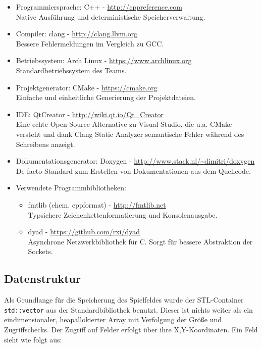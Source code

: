\documentclass[12pt,a4paper]{article}
\begin{document}
\begin{itemize}
\item Programmiersprache: C++ - \url{http://cppreference.com} \\
Native Ausführung und deterministische Speicherverwaltung.
\item Compiler: clang - \url{http://clang.llvm.org} \\
Bessere Fehlermeldungen im Vergleich zu GCC.
\item Betriebssystem: Arch Linux - \url{https://www.archlinux.org} \\
Standardbetriebssystem des Teams.
\item Projektgenerator: CMake - \url{https://cmake.org} \\
Einfache und einheitliche Generierung der Projektdateien.
\item IDE: QtCreator - \url{http://wiki.qt.io/Qt_Creator} \\
Eine echte Open Source Alternative zu Visual Studio, die u.a. CMake versteht und dank Clang Static Analyzer semantische Fehler während des Schreibens anzeigt.
\item Dokumentationsgenerator: Doxygen - \url{http://www.stack.nl/~dimitri/doxygen} \\
De facto Standard zum Erstellen von Dokumentationen aus dem Quellcode.

\item Verwendete Programmbibliotheken:
\begin{itemize}
\item fmtlib (ehem. cppformat) - \url{http://fmtlib.net} \\
Typsichere Zeichenkettenformatierung und Konsolenausgabe.
\item dyad - \url{https://github.com/rxi/dyad} \\
Asynchrone Netzwerkbibliothek für C. Sorgt für bessere Abstraktion der Sockets.
\end{itemize}

\end{itemize}
\newpage

\subsection{Datenstruktur}
Als Grundlange für die Speicherung des Spielfeldes wurde der STL-Container \texttt{std::vector} aus der Standardbibliothek benutzt. Dieser ist nichts weiter als ein eindimensionaler, heapallokierter Array mit Verfolgung der Größe und Zugriffschecks. Der Zugriff auf Felder erfolgt über ihre X,Y-Koordinaten.
Ein Feld sieht wie folgt aus:
\end{document}
